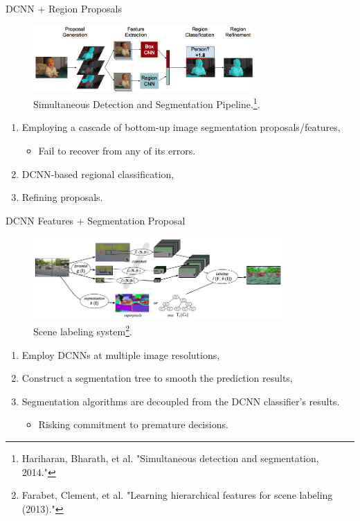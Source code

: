 \documentclass{beamer}
\newcommand\con{\item[$-$]}
\begin{document}
\begin{frame}{DCNN + Region Proposals }
\begin{figure}
	\centering
	\includegraphics[width=0.75\textwidth]{figure/ss15.png}
	\captionsetup{justification=centering}
	\caption{Simultaneous Detection and Segmentation Pipeline.\footnote{Hariharan, Bharath, et al. "Simultaneous detection and segmentation, 2014."}.}	
\end{figure}
\vspace{-0.3cm}
\begin{enumerate}
	\item Employing a cascade of bottom-up image segmentation proposals/features,
\begin{itemize}
	\con Fail to recover from any of its errors.
\end{itemize}
	\item <2->DCNN-based regional classification,
	\item <3->Refining proposals.
\end{enumerate}
\end{frame}

\begin{frame}{DCNN Features + Segmentation Proposal}

\begin{figure}
	\centering
	\includegraphics[width=0.85\textwidth]{figure/ss16.png}
	\captionsetup{justification=centering}
	\caption{Scene labeling system\footnote{Farabet, Clement, et al. "Learning hierarchical features for scene labeling (2013)."}.}	
\end{figure}
\vspace{-0.5cm}
\begin{enumerate}
	\item Employ DCNNs at multiple image resolutions,
	\item<2-> Construct a segmentation tree to smooth the prediction results,
	\item<3-> Segmentation algorithms are decoupled from the DCNN classifier’s results.
	\begin{itemize}
		\con Risking commitment to premature decisions.
	\end{itemize}
\end{enumerate}
\end{frame}
\end{document}
